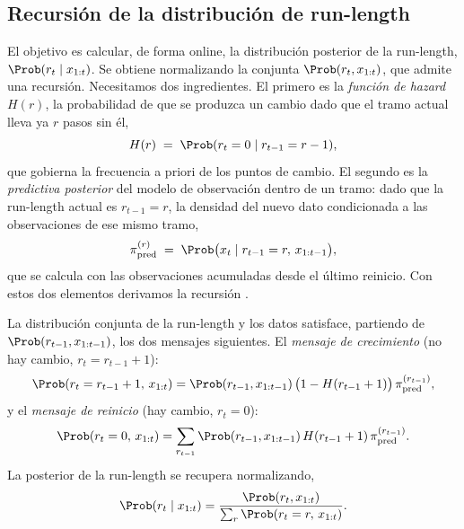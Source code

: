 \subsection{Recursión de la distribución de run-length}
\label{sec:bocpd-recursion}

El objetivo es calcular, de forma online, la distribución posterior de la run-length, $\Prob(r_t \mid x_{1:t})$. Se obtiene normalizando la conjunta $\Prob(r_t, x_{1:t})$, que admite una recursión. Necesitamos dos ingredientes. El primero es la \emph{función de hazard} $H(r)$, la probabilidad de que se produzca un cambio dado que el tramo actual lleva ya $r$ pasos sin él,
\[
H(r) \;=\; \Prob(r_t = 0 \mid r_{t-1} = r - 1),
\]
que gobierna la frecuencia a priori de los puntos de cambio. El segundo es la \emph{predictiva posterior} del modelo de observación dentro de un tramo: dado que la run-length actual es $r_{t-1} = r$, la densidad del nuevo dato condicionada a las observaciones de ese mismo tramo,
\[
\pi^{(r)}_{\mathrm{pred}} \;=\; \Prob\big(x_t \mid r_{t-1} = r,\, x_{1:t-1}\big),
\]
que se calcula con las observaciones acumuladas desde el último reinicio. Con estos dos elementos derivamos la recursión \cite{adams2007}.

\begin{proposicion}
\label{prop:bocpd}
La distribución conjunta de la run-length y los datos satisface, partiendo de $\Prob(r_{t-1}, x_{1:t-1})$, los dos mensajes siguientes. El \emph{mensaje de crecimiento} (no hay cambio, $r_t = r_{t-1} + 1$):
\[
\Prob(r_t = r_{t-1} + 1,\, x_{1:t})
= \Prob(r_{t-1}, x_{1:t-1})\,\big(1 - H(r_{t-1} + 1)\big)\,\pi^{(r_{t-1})}_{\mathrm{pred}},
\]
y el \emph{mensaje de reinicio} (hay cambio, $r_t = 0$):
\[
\Prob(r_t = 0,\, x_{1:t})
= \sum_{r_{t-1}} \Prob(r_{t-1}, x_{1:t-1})\, H(r_{t-1} + 1)\, \pi^{(r_{t-1})}_{\mathrm{pred}}.
\]
La posterior de la run-length se recupera normalizando,
\[
\Prob(r_t \mid x_{1:t}) = \frac{\Prob(r_t, x_{1:t})}{\sum_{r} \Prob(r_t = r,\, x_{1:t})}.
\]
\end{proposicion}

